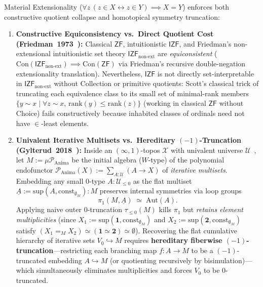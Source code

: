 \begin{proposition}\label{prop:extensionality-truncation}%
%
%
Material Extensionality ($\forall z\,(z \in X \leftrightarrow z \in Y) \implies X = Y$) enforces both constructive quotient collapse and homotopical symmetry truncation:
\begin{enumerate}
  \item \textbf{Constructive Equiconsistency vs.\ Direct Quotient Cost (Friedman~1973~\cite{Friedman73}):} Classical $\mathsf{ZF}$, intuitionistic $\mathsf{IZF}$, and Friedman's non-extensional intuitionistic set theory $\mathsf{IZF}_{\mathrm{non\text{-}ext}}$ are \emph{equiconsistent} ($\mathrm{Con}(\mathsf{IZF}_{\mathrm{non\text{-}ext}}) \implies \mathrm{Con}(\mathsf{ZF})$ via Friedman's recursive double-negation extensionality translation). Nevertheless, $\mathsf{IZF}$ is not directly set-interpretable in $\mathsf{IZF}_{\mathrm{non\text{-}ext}}$ without Collection or primitive quotients: Scott's classical trick of truncating each equivalence class to its small set of minimal-rank members $\{y \sim x \mid \forall z \sim x,\, \mathrm{rank}(y) \le \mathrm{rank}(z)\}$ (working in classical $\mathsf{ZF}$ without Choice) fails constructively because inhabited classes of ordinals need not have $\in$-least elements.
  \item \textbf{Univalent Iterative Multisets vs.\ Hereditary $(-1)$-Truncation (Gylterud~2018~\cite[Thm.~3.9]{Gylterud18}):} Inside an $(\infty, 1)$-topos $\mathcal{X}$ with univalent universe $\mathcal{U}$~\cite[\S 6.1.6]{Lurie09}, let $M := \mu \mathcal{P}_{\mathrm{Anima}}$ be the initial algebra ($W$-type) of the polynomial endofunctor $\mathcal{P}_{\mathrm{Anima}}(X) := \sum_{A : \mathcal{U}} (A \to X)$ of \emph{iterative multisets}. Embedding any small $0$-type $A : \mathcal{U}_{\le 0}$ as the flat multiset $\underline{A} := \mathrm{sup}(A, \mathrm{const}_{\emptyset_M}) : M$ preserves internal symmetries via loop groups
  \[
    \pi_1(M, \underline{A}) \;\simeq\; \mathrm{Aut}(A).
  \]
  Applying naive outer $0$-truncation $\tau_{\le 0}(M)$ kills $\pi_1$ but \emph{retains element multiplicities} (since $X_1 := \mathrm{sup}(\mathbf{1}, \mathrm{const}_{\emptyset_M})$ and $X_2 := \mathrm{sup}(\mathbf{2}, \mathrm{const}_{\emptyset_M})$ satisfy $(X_1 =_M X_2) \simeq (\mathbf{1} \simeq \mathbf{2}) \simeq \emptyset$). Recovering the flat cumulative hierarchy of iterative sets $V_0 \hookrightarrow M$ requires \textbf{hereditary fiberwise $(-1)$-truncation}---restricting each branching map $f : A \to M$ to be a $(-1)$-truncated embedding $A \hookrightarrow M$ (or quotienting recursively by bisimulation)---which simultaneously eliminates multiplicities and forces $V_0$ to be $0$-truncated.
\end{enumerate}
\end{proposition}

